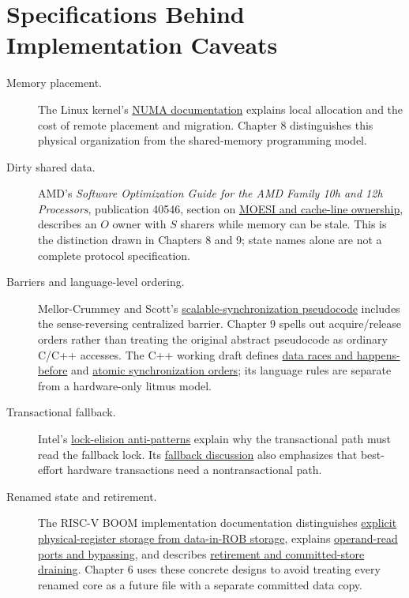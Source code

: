 \section*{Specifications Behind Implementation Caveats}
\begin{description}
  \item[Memory placement.] The Linux kernel's \href{https://docs.kernel.org/mm/numa.html}{NUMA documentation} explains local allocation and the cost of remote placement and migration. Chapter 8 distinguishes this physical organization from the shared-memory programming model.
  \item[Dirty shared data.] AMD's \emph{Software Optimization Guide for the AMD Family 10h and 12h Processors}, publication 40546, section on \href{https://www.amd.com/content/dam/amd/en/documents/archived-tech-docs/software-optimization-guides/40546.pdf}{MOESI and cache-line ownership}, describes an $O$ owner with $S$ sharers while memory can be stale. This is the distinction drawn in Chapters 8 and 9; state names alone are not a complete protocol specification.
  \item[Barriers and language-level ordering.] Mellor-Crummey and Scott's \href{https://www.cs.rochester.edu/research/synchronization/pseudocode/ss.html}{scalable-synchronization pseudocode} includes the sense-reversing centralized barrier. Chapter 9 spells out acquire/release orders rather than treating the original abstract pseudocode as ordinary C/C++ accesses. The C++ working draft defines \href{https://eel.is/c++draft/intro.races}{data races and happens-before} and \href{https://eel.is/c++draft/atomics.order}{atomic synchronization orders}; its language rules are separate from a hardware-only litmus model.
  \item[Transactional fallback.] Intel's \href{https://www.intel.com/content/www/us/en/developer/articles/technical/tsx-anti-patterns-in-lock-elision-code.html}{lock-elision anti-patterns} explain why the transactional path must read the fallback lock. Its \href{https://www.intel.com/content/www/us/en/developer/articles/community/tsx-fallback-paths.html}{fallback discussion} also emphasizes that best-effort hardware transactions need a nontransactional path.
  \item[Renamed state and retirement.] The RISC-V BOOM implementation documentation distinguishes \href{https://docs.boom-core.org/en/latest/sections/rename-stage.html}{explicit physical-register storage from data-in-ROB storage}, explains \href{https://docs.boom-core.org/en/latest/sections/reg-file-bypass-network.html}{operand-read ports and bypassing}, and describes \href{https://docs.boom-core.org/en/latest/sections/reorder-buffer.html}{retirement and committed-store draining}. Chapter 6 uses these concrete designs to avoid treating every renamed core as a future file with a separate committed data copy.

\end{description}
